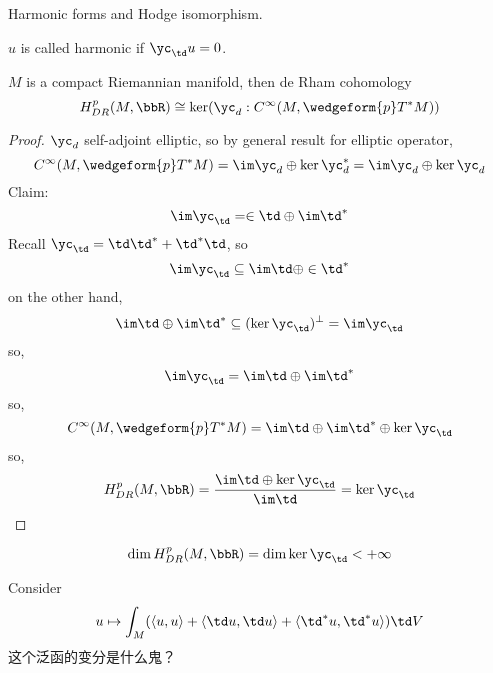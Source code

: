 Harmonic forms and Hodge isomorphism.
\begin{definition}
$u$ is called harmonic if $\yc_{\td}u=0$.
\end{definition}

\begin{thm}
$M$ is a compact Riemannian manifold, 
then de Rham cohomology
$$H^p_{DR}(M,\bbR)\cong
\ker(\yc_d:C^\infty(M,\wedgeform{p}T^*M))
$$
\end{thm}
\begin{proof}
$\yc_d$ self-adjoint elliptic, so by general result for elliptic operator,
$$C^\infty(M,\wedgeform{p}T^*M)=\im\yc_d\oplus\ker\yc_d^*
=\im\yc_d\oplus\ker\yc_d$$
Claim:
$$\im\yc_{\td}=\in \td\oplus\im\td^*$$
Recall $\yc_{\td}=\td\td^*+\td^*\td$, so 
$$\im\yc_\td\subseteq\im\td\oplus\in\td^*$$
on the other hand, 
$$\im\td\oplus\im\td^*\subseteq(\ker\yc_\td)^\bot=\im\yc_\td$$
so, 
$$\im\yc_\td=\im\td\oplus\im\td^*$$
so, 
$$C^\infty(M,\wedgeform{p}T^*M)=
\im\td\oplus\im\td^*\oplus\ker\yc_\td
$$
so,
$$
  H^p_{DR}(M,\bbR)
=\frac{\im\td\oplus\ker\yc_\td}{\im\td}=\ker\yc_\td
$$
\end{proof}

\begin{cor}
$$\dim H^{p}_{DR}(M,\bbR)=\dim\ker\yc_\td<+\infty$$
\end{cor}

\begin{rem}Consider
$$u\mapsto \int_M(
  \langle u,u \rangle+
  \langle \td u,\td u \rangle+
  \langle \td^*u,\td^*u \rangle
)\td V$$
这个泛函的变分是什么鬼？
\end{rem}











